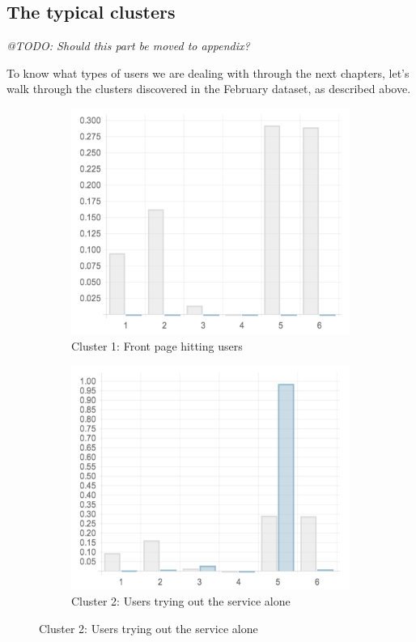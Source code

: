 \subsection{The typical clusters}
\label{eval:sec:typical_clusters}

\emph{@TODO: Should this part be moved to appendix?}

To know what types of users we are dealing with through the next chapters, let's walk through the clusters discovered in the February dataset, as described above.

\begin{figure}
  \centering
  \begin{subfigure}[t]{0.45\textwidth}
    \includegraphics[width=\textwidth]{Figures/clusterings/confluence-post/cluster1-chart}
    \caption{Cluster 1: Front page hitting users}
    \label{fig:cluster1-chart}
  \end{subfigure}
  \hfill
  \begin{subfigure}[t]{0.45\textwidth}
    \includegraphics[width=\textwidth]{Figures/clusterings/confluence-post/cluster2-chart}
    \caption{Cluster 2: Users trying out the service alone}
    \label{fig:cluster2-chart}
  \end{subfigure}


\end{figure}
